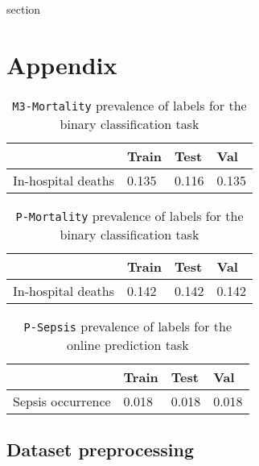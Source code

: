 \documentclass{article}
\newcommand{\dataset}[1]{\texttt{#1}}
\begin{document}
 {section}

\clearpage
\appendix

\section{Appendix}

\begin{table}[h]
    \centering
    \caption{\dataset{M3-Mortality} prevalence of labels for the binary classification task}
    \vspace{0.10in}
    \begin{tabularx}{\linewidth}{llll}
 \toprule
  & Train & Test & Val\\ \midrule
  In-hospital deaths & \num{0.135} & \num{0.116} & \num{0.135}  \\
\bottomrule
\end{tabularx}
     \label{tab:mimic binary prevalence}
\end{table}

\begin{table}[h]
    \centering
    \caption{\dataset{P-Mortality} prevalence of labels for the binary classification task}
    \vspace{0.10in}
    \begin{tabularx}{\linewidth}{llll}
 \toprule
  & Train & Test & Val\\ \midrule
  In-hospital deaths & \num{0.142} & \num{0.142} & \num{0.142}\\
\bottomrule
\end{tabularx}
     \label{tab:physionet prevalence}
\end{table}

\begin{table}[ht]
    \centering
    \caption{\dataset{P-Sepsis} prevalence of labels for the online
      prediction task}
    \vspace{0.10in}
    \begin{tabularx}{\linewidth}{llll}
     \toprule
      & Train & Test & Val\\ \midrule
      Sepsis occurrence & \num{0.018} & \num{0.018} & \num{0.018}\\
    \bottomrule
    \end{tabularx}
    \label{tab:sepsis prevalence}
\end{table}


\subsection{Dataset preprocessing} \label{appx:data-filtering}
\end{document}
